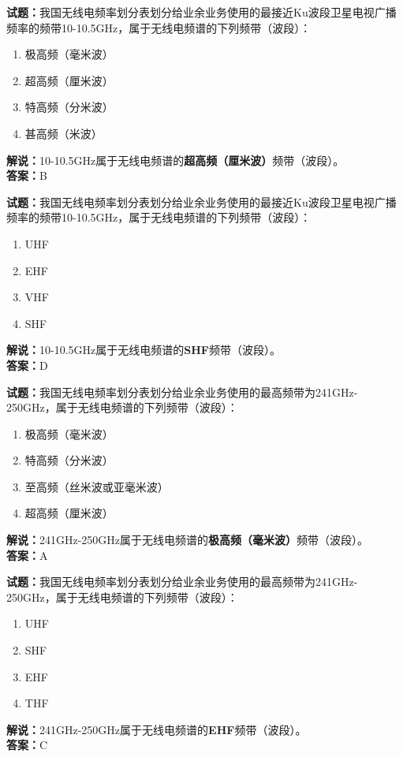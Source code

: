 \documentclass{ctexbook}
\begin{document}

\bigskip


\noindent\textbf{试题：}我国无线电频率划分表划分给业余业务使用的最接近Ku波段卫星电视广播频率的频带10-10.5\unit{\GHz}，属于无线电频谱的下列频带（波段）：
\begin{enumerate}[leftmargin=3em]
\item 极高频（毫米波）
\item 超高频（厘米波）
\item 特高频（分米波）
\item 甚高频（米波）
\end{enumerate}
\noindent\textbf{解说：}10-10.5\unit{\GHz}属于无线电频谱的\textbf{超高频（厘米波）}频带（波段）。\\\noindent\textbf{答案：}B


\bigskip


\noindent\textbf{试题：}我国无线电频率划分表划分给业余业务使用的最接近Ku波段卫星电视广播频率的频带10-10.5\unit{\GHz}，属于无线电频谱的下列频带（波段）：
\begin{enumerate}[leftmargin=3em]
\item UHF
\item EHF
\item VHF
\item SHF
\end{enumerate}
\noindent\textbf{解说：}10-10.5\unit{\GHz}属于无线电频谱的\textbf{SHF}频带（波段）。\\\noindent\textbf{答案：}D


\bigskip


\noindent\textbf{试题：}我国无线电频率划分表划分给业余业务使用的最高频带为241\unit{\GHz}-250\unit{\GHz}，属于无线电频谱的下列频带（波段）：
\begin{enumerate}[leftmargin=3em]
\item 极高频（毫米波）
\item 特高频（分米波）
\item 至高频（丝米波或亚毫米波）
\item 超高频（厘米波）
\end{enumerate}
\noindent\textbf{解说：}241\unit{\GHz}-250\unit{\GHz}属于无线电频谱的\textbf{极高频（毫米波）}频带（波段）。\\\noindent\textbf{答案：}A




\bigskip


\noindent\textbf{试题：}我国无线电频率划分表划分给业余业务使用的最高频带为241\unit{\GHz}-250\unit{\GHz}，属于无线电频谱的下列频带（波段）：
\begin{enumerate}[leftmargin=3em]
\item UHF
\item SHF
\item EHF
\item THF
\end{enumerate}
\noindent\textbf{解说：}241\unit{\GHz}-250\unit{\GHz}属于无线电频谱的\textbf{EHF}频带（波段）。\\\noindent\textbf{答案：}C
\end{document}
